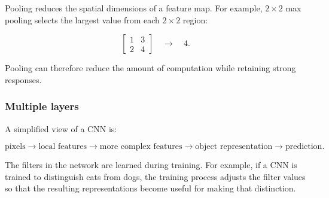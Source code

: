 \documentclass{course_sheet}
\begin{document}
Pooling reduces the spatial dimensions of a feature map. For example, $2 \times 2$ max pooling selects the largest value from each $2 \times 2$ region:

\[
\begin{bmatrix}
1 & 3\\
2 & 4
\end{bmatrix}
\quad \longrightarrow \quad
4.
\]

Pooling can therefore reduce the amount of computation while retaining strong responses.

\subsubsection*{Multiple layers}

A simplified view of a CNN is:

\[
\text{pixels}
\longrightarrow
\text{local features}
\longrightarrow
\text{more complex features}
\longrightarrow
\text{object representation}
\longrightarrow
\text{prediction}.
\]

The filters in the network are learned during training. For example, if a CNN is trained to distinguish cats from dogs, the training process adjusts the filter values so that the resulting representations become useful for making that distinction.
\end{document}
